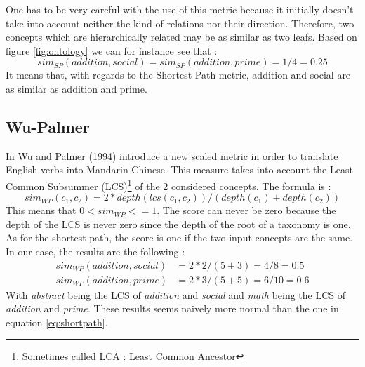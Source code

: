 One has to be very careful with the use of this metric because it initially doesn't take into account neither the kind of relations nor their direction. Therefore, two concepts which are hierarchically related may be as similar as two leafs. Based on figure \ref{fig:ontology} we can for instance see that :
\begin{equation}
\label{eq:shortpath}
sim_{SP}(addition, social) = sim_{SP}(addition, prime) = 1/4 = 0.25
\end{equation}
It means that, with regards to the Shortest Path metric, addition and social are as similar as addition and prime.

\subsection{Wu-Palmer} %
\label{ssub:wu_palmer}
In \cite{wu1994verbs} Wu and Palmer (1994) introduce a new scaled metric in order to translate English verbs into Mandarin Chinese. This measure takes into account the Least Common Subsummer (LCS)\footnote{Sometimes called LCA : Least Common Ancestor} of the 2 considered concepts. The formula is :
\begin{equation}
\label{eq:wupalmer}
sim_{WP}(c_1, c_2) = 2*depth(lcs(c_1,c_2)) / (depth(c_1) + depth(c_2))
\end{equation}
This means that $0 < sim_{WP} <= 1$. The score can never be zero because the depth of the LCS is never zero since the depth of the root of a taxonomy is one. As for the shortest path, the score is one if the two input concepts are the same.\\
In our case, the results are the following :
\begin{align}
\label{eq:resultsWP}
sim_{WP}(addition, social)& = 2*2 / (5 + 3) = 4/8 = 0.5\\
sim_{WP}(addition, prime)& = 2*3 / (5 + 5) = 6/10 = 0.6
\end{align}
With \textit{abstract} being the LCS of \textit{addition} and \textit{social} and \textit{math} being the LCS of \textit{addition} and \textit{prime}. These results seems naively more normal than the one in equation \eqref{eq:shortpath}.\\

